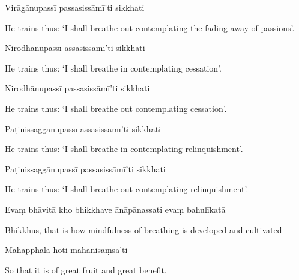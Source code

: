 Virāgānupassī passasissāmī'ti sikkhati

\begin{english}
  He trains thus: `I shall breathe out contemplating the fading away of passions'.
\end{english}

Nirodhānupassī assasissāmī'ti sikkhati

\begin{english}
  He trains thus: `I shall breathe in contemplating cessation'.
\end{english}

Nirodhānupassī passasissāmī'ti sikkhati

\begin{english}
  He trains thus: `I shall breathe out contemplating cessation'.
\end{english}

Paṭinissaggānupassī assasissāmī'ti sikkhati

\begin{english}
  He trains thus: `I shall breathe in contemplating relinquishment'.
\end{english}

Paṭinissaggānupassī passasissāmī'ti sikkhati

\begin{english}
  He trains thus: `I shall breathe out contemplating relinquishment'.
\end{english}

Evaṃ bhāvitā kho bhikkhave ānāpānassati evaṃ bahulīkatā

\begin{english}
  Bhikkhus, that is how mindfulness of breathing is developed and cultivated
\end{english}

Mahapphalā hoti mahānisaṃsā'ti

\begin{english}
  So that it is of great fruit and great benefit.
\end{english}

